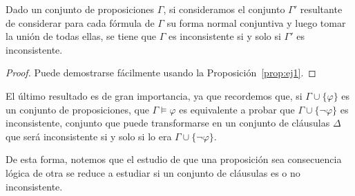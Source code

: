 \begin{comment}
 \begin{prop}\label{prop:ej1}
     Dado el conjunto de proposiciones $\{\psi_1,\ldots,\psi_n\}$, son equivalentes:
     \begin{itemize}
         \item $\{\psi_1,\ldots,\psi_n\}$ es inconsistente.
         \item $\{\psi_1\land\ldots\land\psi_n\}$ es inconsistente.
     \end{itemize}
     \begin{proof}
         Notemos que decir que $\{\psi_1\land \ldots \land \psi_n\}$ sea inconsistente significa que dada una interpretación $I$, entonces:
         \begin{equation*}
             I(\psi_1\land \ldots \land \psi_n) = \prod_{k=1}^{n}I(\psi_k) = 0
         \end{equation*}
         $\{\psi_1,\ldots,\psi_n\}$ será inconsistente si y solo si dada una interpretación $I$ hay alguna proposición $\psi_i$ de forma que $I(\psi_i)=0$, si y solo si $\prod\limits_{k=1}^{n}I(\psi_k)=0$, lo que equivale con que $\{\psi_1\land\ldots\land\psi_n\}$ sea inconsistente.
     \end{proof}
 \end{prop}
\end{comment}

 \begin{prop}
     Dado un conjunto de proposiciones $\Gamma$, si consideramos el conjunto $\Gamma'$ resultante de considerar para cada fórmula de $\Gamma$ su forma normal conjuntiva y luego tomar la unión de todas ellas, se tiene que $\Gamma$ es inconsistente si y solo si $\Gamma'$ es inconsistente.
     \begin{proof}
         Puede demostrarse fácilmente usando la Proposición~\ref{prop:ej1}.
     \end{proof}
 \end{prop}

 El último resultado es de gran importancia, ya que recordemos que, si $\Gamma\cup\{\varphi\}$ es un conjunto de proposiciones, que $\Gamma\vDash\varphi$ es equivalente a probar que $\Gamma\cup\{\lnot\varphi\}$ es inconsistente, conjunto que puede transformarse en un conjunto de cláusulas $\Delta$ que será inconsistente si y solo si lo era $\Gamma\cup\{\lnot\varphi\}$.

 De esta forma, notemos que el estudio de que una proposición sea consecuencia lógica de otra se reduce a estudiar si un conjunto de cláusulas es o no inconsistente.

